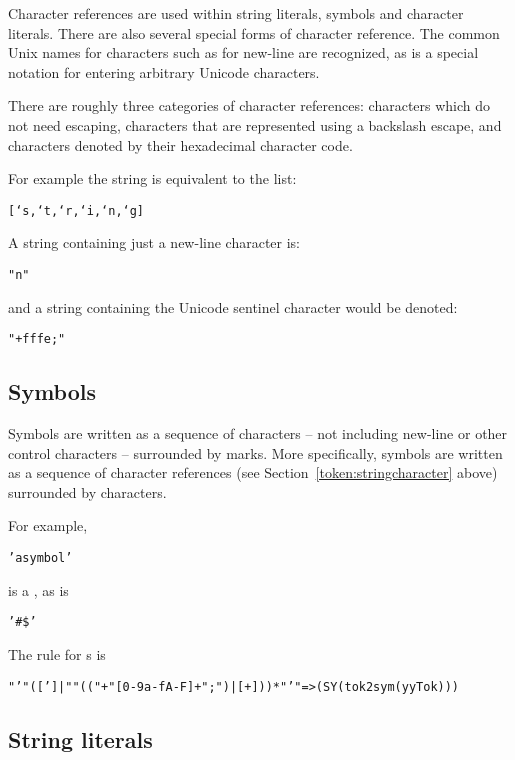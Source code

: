 Character references are used within string literals, symbols and character literals. There are also several special forms of character reference. The common Unix names for characters such as  for new-line are recognized, as is a special notation for entering arbitrary Unicode characters.

There are roughly three categories of character references: characters which do not need escaping, characters that are represented using a backslash escape, and characters denoted by their hexadecimal character code.

For example the string  is equivalent to the list:
\begin{alltt}
[`s,`t,`r,`i,`n,`g]
\end{alltt}
A string containing just a new-line character is:
\begin{alltt}
"\bsl{}n"
\end{alltt}
and a string containing the Unicode sentinel character would be denoted:
\begin{alltt}
"\bsl{}+fffe;"
\end{alltt}

\subsection{Symbols}
\label{token:symbol}

Symbols are written as a sequence of characters -- not including new-line or other control characters -- surrounded by  marks. More specifically, symbols are written as a sequence of character references (see Section~\ref{token:stringcharacter} above) surrounded by  characters.

For example,
\begin{alltt}
'a symbol'
\end{alltt}
is a , as is
\begin{alltt}
'#\$'
\end{alltt}
The rule for s is
\begin{alltt}
"'"([\uphat\bsl\bsl']|"\bsl\bsl"(("+"[0-9a-fA-F]+";")|[\uphat+]))*"'" => (SY(tok2sym(yyTok)))
\end{alltt}

\subsection{String literals}
\label{token:string}

